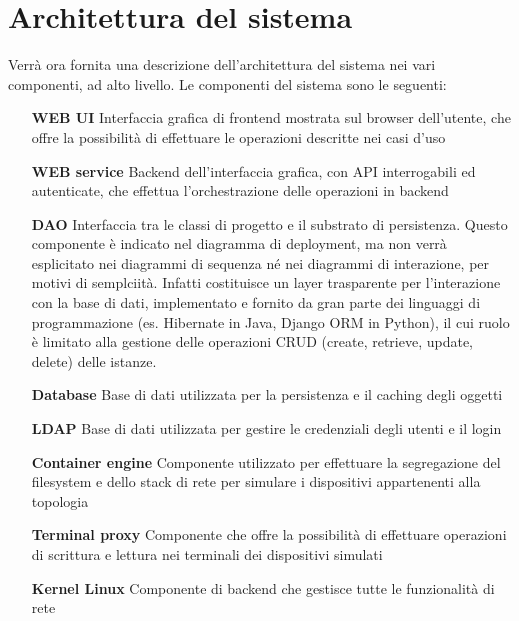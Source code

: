 \documentclass[../main.tex]{subfiles}
\begin{document}
\chapter{Architettura del sistema}
Verr\`a ora fornita una descrizione dell'architettura del sistema nei vari componenti, ad alto livello.
Le componenti del sistema sono le seguenti:
\\
\begin{itemize}
    \setlength\itemsep{1em}
    \item[\textbf{WEB UI}] Interfaccia grafica di frontend mostrata sul browser dell'utente, che offre la possibilità di effettuare le operazioni descritte nei casi d'uso
    \item[\textbf{WEB service}] Backend dell'interfaccia grafica, con API interrogabili ed autenticate, che effettua l'orchestrazione delle operazioni in backend
    \item[\textbf{DAO}] Interfaccia tra le classi di progetto e il substrato di persistenza. Questo componente \`e indicato nel diagramma di deployment, ma non verr\`a esplicitato nei diagrammi di sequenza né nei diagrammi di interazione, per motivi di semplciit\`a. Infatti costituisce un layer trasparente per l'interazione con la base di dati, implementato e fornito da gran parte dei linguaggi di programmazione (es. Hibernate in Java, Django ORM in Python), il cui ruolo \`e limitato alla gestione delle operazioni CRUD (create, retrieve, update, delete) delle istanze.
    \item[\textbf{Database}] Base di dati utilizzata per la persistenza e il caching degli oggetti
    \item[\textbf{LDAP}] Base di dati utilizzata per gestire le credenziali degli utenti e il login
    \item[\textbf{Container engine}] Componente utilizzato per effettuare la segregazione del filesystem e dello stack di rete per simulare i dispositivi appartenenti alla topologia
    \item[\textbf{Terminal proxy}] Componente che offre la possibilit\`a di effettuare operazioni di scrittura e lettura nei terminali dei dispositivi simulati
    \item[\textbf{Kernel Linux}] Componente di backend che gestisce tutte le funzionalit\`a di rete
\end{itemize}
\end{document}
